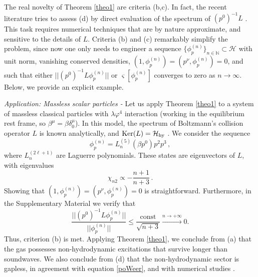 \documentclass[a4paper, amsfonts, amssymb, amsmath, reprint, showkeys, nofootinbib, twoside, onecolumn,notitlepage,,longbibliography]{revtex4-2}
\theoremstyle{definition}
\theoremstyle{theorem}
\theoremstyle{corollary}
\begin{document}
The real novelty of Theorem \ref{theo1} are criteria (b,c). In fact, the recent literature tries to assess (d) by direct evaluation of the spectrum of $(p^0)^{-1}L$ \cite{Moore:2018mma,RochaCut2024cge}. This task requires numerical techniques that are by nature approximate, and sensitive to the details of $L$. Criteria (b) and (c) remarkably simplify the problem, since now one only needs to engineer a sequence $\{\phi_p^{(n)} \}_{n\in \mathbb{N}} \subset \mathcal{H}$ with unit norm, vanishing conserved densities, $(1,\phi_p^{(n)}){=}(p^\nu,\phi_p^{(n)}){=}0$, and such that either $ || (p^0)^{-1}L \phi_p^{(n)} ||$ or $\varsigma[\phi_p^{(n)}]$ converges to zero as $n{\rightarrow} \infty$. Below, we provide an explicit example.


\noindent \textit{Application: Massless scalar particles -} Let us apply Theorem \ref{theo1} to a system of massless classical particles with $\lambda \varphi^4$ interaction (working in the equilibrium rest frame, so $\beta^\mu = \beta \delta^\mu_0$). In this model, the spectrum of Boltzmann's collision operator $L$ is known analytically, and $\textup{Ker}(L)= \mathcal{H}_{\textup{hy}}$ \cite{Denicol:2022bsq}. We consider the sequence
\begin{equation}\label{phipnphi4}
    \phi_p^{(n)} =L_n^{(5)}(\beta p^0) p^{2} p^{3} \,  ,
\end{equation}
where $L^{(2\ell+1)}_n$ are Laguerre polynomials. These states are eigenvectors of $L$, with eigenvalues
\begin{equation}
\chi_{n2} \propto -  \dfrac{n{+}1}{n{+}3} \, . 
\end{equation}
Showing that $(1,\phi_p^{(n)})=(p^\nu,\phi_p^{(n)})=0$ is straightforward. Furthermore, in the Supplementary Material we verify that
\begin{equation}
    \dfrac{|| (p^0)^{-1} L\phi_p^{(n)} ||}{|| \phi_p^{(n)} ||} \leq  \dfrac{\text{const}}{\sqrt{n{+}3}}  \xrightarrow[]{n\rightarrow +\infty} 0.
\end{equation}
Thus, criterion (b) is met. Applying Theorem \ref{theo1}, we conclude from (a) that the gas possesses non-hydrodynamic excitations that survive longer than soundwaves. We also conclude from (d) that the non-hydrodynamic sector is gapless, in agreement with equation \eqref{poWeer}, and with numerical studies \cite{Moore:2018mma,RochaCut2024cge}.
\end{document}
